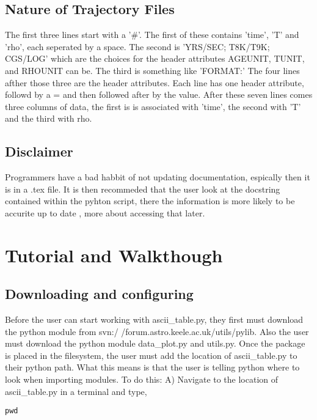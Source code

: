 \subsection{Nature of Trajectory Files}
The first three lines start with a '\#'. The first of these contains 'time', 'T' 
	and 'rho', each seperated by a space. The second is 'YRS/SEC; T8K/T9K; 
	CGS/LOG' which are the choices for the header attributes
	AGEUNIT, TUNIT, and RHOUNIT can be. The third is something like 'FORMAT:'\newline
The four lines afther those three are the header attributes. Each line has one
	header attribute, followd by a = and then followed after by the value.\newline
After these seven lines comes three columns of data, the first is is associated 
	with 'time', the second with 'T' and the third with rho.\newline
\subsection{Disclaimer}
Programmers have a bad habbit of not updating documentation, espically then it is in  a .tex file.
It is then recommeded that the user look at the docstring contained within the pyhton script, there the information is more likely to be accurite up to date
, more about accessing that later.

\section{Tutorial and Walkthough}

\subsection{Downloading and configuring}
Before the user can start working with ascii\_table.py, they first must download the python 
module from svn:/ /forum.astro.keele.ac.uk/utils/pylib.  Also the user must download the python module data\_plot.py and utils.py. Once the package is placed in the filesystem, the user must add the location
of ascii\_table.py to their python path.  What this means is that the user is telling python where to look when importing modules.
To do this:
\newline
A) Navigate to the location of ascii\_table.py in a terminal and type,

\begin{verbatim}
pwd
\end{verbatim}

